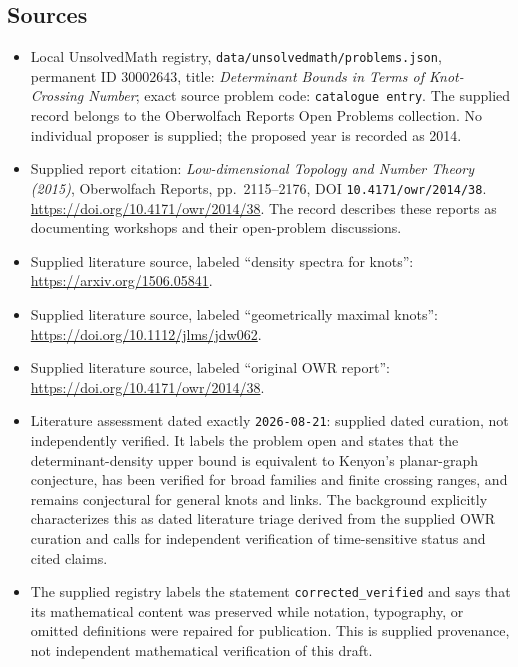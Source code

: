 \documentclass[11pt]{article}
\begin{document}
\subsection{Sources}
\begin{itemize}
\item Local UnsolvedMath registry, \texttt{data/unsolvedmath/problems.json}, permanent ID \(30002643\), title: \emph{Determinant Bounds in Terms of Knot-Crossing Number}; exact source problem code: \texttt{catalogue entry}. The supplied record belongs to the Oberwolfach Reports Open Problems collection. No individual proposer is supplied; the proposed year is recorded as 2014.
\item Supplied report citation: \emph{Low-dimensional Topology and Number Theory (2015)}, Oberwolfach Reports, pp.\ 2115--2176, DOI \texttt{10.4171/owr/2014/38}. \url{https://doi.org/10.4171/owr/2014/38}. The record describes these reports as documenting workshops and their open-problem discussions.
\item Supplied literature source, labeled ``density spectra for knots'': \url{https://arxiv.org/1506.05841}.
\item Supplied literature source, labeled ``geometrically maximal knots'': \url{https://doi.org/10.1112/jlms/jdw062}.
\item Supplied literature source, labeled ``original OWR report'': \url{https://doi.org/10.4171/owr/2014/38}.
\item Literature assessment dated exactly \texttt{2026-08-21}: supplied dated curation, not independently verified. It labels the problem open and states that the determinant-density upper bound is equivalent to Kenyon's planar-graph conjecture, has been verified for broad families and finite crossing ranges, and remains conjectural for general knots and links. The background explicitly characterizes this as dated literature triage derived from the supplied OWR curation and calls for independent verification of time-sensitive status and cited claims.
\item The supplied registry labels the statement \texttt{corrected\_verified} and says that its mathematical content was preserved while notation, typography, or omitted definitions were repaired for publication. This is supplied provenance, not independent mathematical verification of this draft.
\end{itemize}
\end{document}
